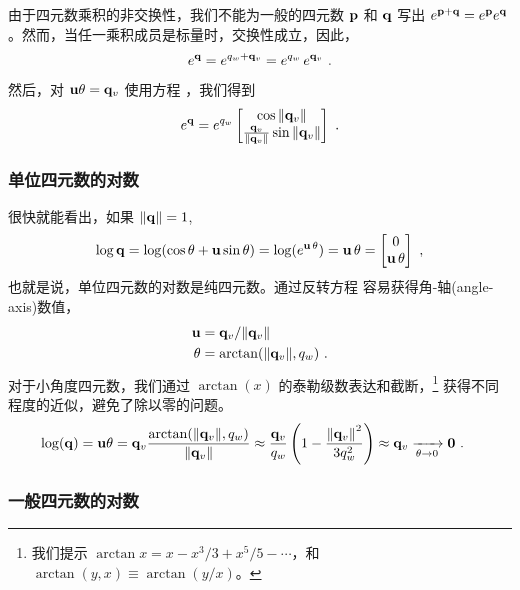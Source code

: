 由于四元数乘积的非交换性，我们不能为一般的四元数 ${\bf p}$ 和 ${\bf q}$ 写出 $e^{{\bf p}+{\bf q}}=e^{\bf p} e^{\bf q} $。然而，当任一乘积成员是标量时，交换性成立，因此，
%
\begin{align}
e^{\bf q} = e^{q_w+{\bf q}_v} = e^{q_w}\,e^{{\bf q}_v} ~.
\end{align}
%
然后，对 ${\bf u}\theta={\bf q}_v$ 使用方程  ，我们得到
%
\begin{align}\label{equ:expGeneralQuat}
e^{\bf q} 
= e^{q_w}\begin{bmatrix}
\cos{\left\|{\bf q}_v\right\|} \\ \frac{{\bf q}_v}{{\left\|{\bf q}_v\right\|}}\sin{\left\|{\bf q}_v\right\|} 
\end{bmatrix}~.
\end{align}
%


\subsubsection{单位四元数的对数}
\label{sec:qlog}

很快就能看出，如果 ${\left\|{\bf q}\right\|}=1$,
%
\begin{align}\label{equ:qlog}
\log {\bf q} = \log (\cos \theta + {\bf u} \sin\theta) = \log(e^{{\bf u}\,\theta}) = {\bf u}\,\theta = \begin{bmatrix}
0 \\ {\bf u}\,\theta
\end{bmatrix}
~,
\end{align}
%
也就是说，单位四元数的对数是纯四元数。通过反转方程  容易获得角-轴(angle-axis)数值，
%
\begin{align}
{\bf u} &= {\bf q}_v / {\left\|{\bf q}_v\right\|} \\
\theta &= \arctan({\left\|{\bf q}_v\right\|},q_w)
~.
\end{align}
%
对于小角度四元数，我们通过 $\arctan(x)$ 的泰勒级数表达和截断，\footnote{我们提示 $\arctan x = x - x^3/3 + x^5/5 - \cdots$，和 $\arctan(y,x)\equiv\arctan(y/x)$。} 获得不同程度的近似，避免了除以零的问题。
%
\begin{align}
\log({\bf q}) 
= {\bf u}\theta 
&= {\bf q}_v\frac{\arctan({{\left\|{\bf q}_v\right\|},q_w})}{{\left\|{\bf q}_v\right\|}} 
\approx \frac{{\bf q}_v}{q_w} \left(1 - \frac{{\left\|{\bf q}_v\right\|}^2}{3q_w^2}\right)
\approx {\bf q}_v
\xrightarrow[\theta\to 0]{}
{\bf 0}
~.
\end{align}
%



\subsubsection{一般四元数的对数}

